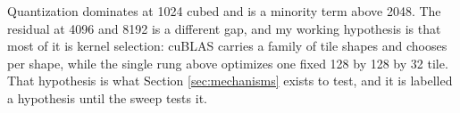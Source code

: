 \begin{table}[htbp]
\centering

\caption{The gap to cuBLAS decomposed. Throughput and percent are measured; the
wave and quantization columns are computed from the tile geometry; the residual is
what quantization does not account for.}
\label{tab:gap}
\end{table}

Quantization dominates at 1024 cubed and is a minority term above 2048. The
residual at 4096 and 8192 is a different gap, and my working hypothesis is that
most of it is kernel selection: cuBLAS carries a family of tile shapes and chooses
per shape, while the single rung above optimizes one fixed 128 by 128 by 32 tile.
That hypothesis is what Section \ref{sec:mechanisms} exists to test, and it is
labelled a hypothesis until the sweep tests it.
